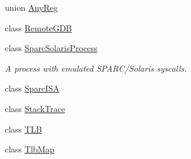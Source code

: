 \begin{DoxyCompactItemize}
union \hyperlink{unionSparcISA_1_1AnyReg}{AnyReg}
\item 
class \hyperlink{classSparcISA_1_1RemoteGDB}{RemoteGDB}
\item 
class \hyperlink{classSparcISA_1_1SparcSolarisProcess}{SparcSolarisProcess}
\begin{DoxyCompactList}\small\item\em A process with emulated SPARC/Solaris syscalls. \item\end{DoxyCompactList}\item 
class \hyperlink{classSparcISA_1_1SparcISA}{SparcISA}
\item 
class \hyperlink{classSparcISA_1_1StackTrace}{StackTrace}
\item 
class \hyperlink{classSparcISA_1_1TLB}{TLB}
\item 
class \hyperlink{classSparcISA_1_1TlbMap}{TlbMap}
\end{DoxyCompactItemize}
